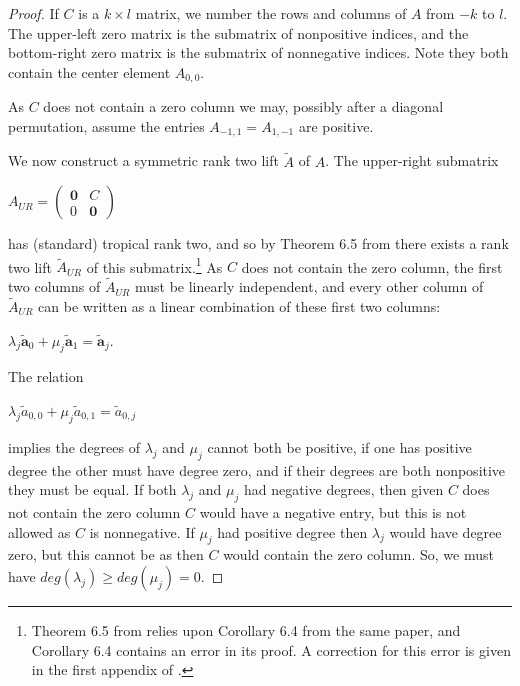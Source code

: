 \documentclass{article}
\begin{document}
\begin{proof}
  If $C$ is a $k \times l$ matrix, we number the rows and columns of $A$ from $-k$ to $l$. The upper-left zero matrix is the submatrix of nonpositive indices, and the bottom-right zero matrix is the submatrix of nonnegative indices. Note they both contain the center element $A_{0,0}$. 
  
  As $C$ does not contain a zero column we may, possibly after a diagonal permutation, assume the entries $A_{-1,1} = A_{1,-1}$ are positive.

  We now construct a symmetric rank two lift $\tilde{A}$ of $A$. The upper-right submatrix
  \begin{center}
    $A_{UR} = \left(\begin{array}{cc} \textbf{0} & C \\ 0 & \textbf{0} \end{array}\right)$
  \end{center}  
  has (standard) tropical rank two, and so by Theorem 6.5 from \cite{dss} there exists a rank two lift $\tilde{A}_{UR}$ of this submatrix.\footnote{Theorem 6.5 from \cite{dss} relies upon Corollary 6.4 from the same paper, and Corollary 6.4 contains an error in its proof. A correction for this error is given in the first appendix of \cite{z}.} As $C$ does not contain the zero column, the first two columns of $\tilde{A}_{UR}$ must be linearly independent, and every other column of $\tilde{A}_{UR}$ can be written as a linear combination of these first two columns:
  \begin{center}
    $\lambda_{j}\tilde{\textbf{a}}_{0} + \mu_{j}\tilde{\textbf{a}}_{1} = \tilde{\textbf{a}}_{j}$.
  \end{center}
 
  The relation
  \begin{center}
    $\lambda_{j}\tilde{a}_{0,0} + \mu_{j}\tilde{a}_{0,1} = \tilde{a}_{0,j}$
  \end{center}
  implies the degrees of $\lambda_{j}$ and $\mu_{j}$ cannot both be positive, if one has positive degree the other must have degree zero, and if their degrees are both nonpositive they must be equal. If both $\lambda_{j}$ and $\mu_{j}$ had negative degrees, then given $C$ does not contain the zero column $C$ would have a negative entry, but this is not allowed as $C$ is nonnegative. If $\mu_{j}$ had positive degree then $\lambda_{j}$ would have degree zero, but this cannot be as then $C$ would contain the zero column. So, we must have $deg(\lambda_{j}) \geq deg(\mu_{j}) = 0$. 
  

\end{proof}
\end{document}
